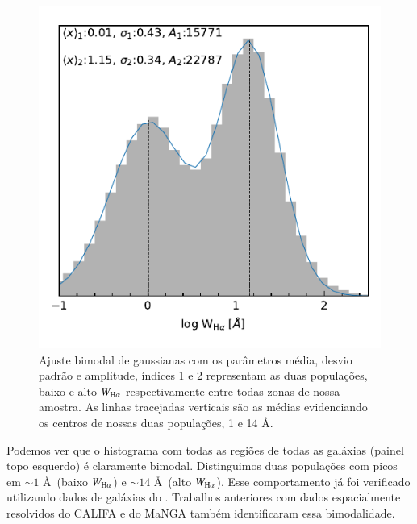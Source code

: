 \begin{figure}
\includegraphics[scale=0.9]{figuras/bimodalWHa_model.pdf}
\caption[Ajuste gaussiano de $W_{\Ha}$]
{Ajuste bimodal de gaussianas com os parâmetros média, desvio padrão e amplitude, índices 1 e 2 representam as duas populações, baixo e alto $W_{\Ha}$ respectivamente entre todas zonas de nossa amostra. As linhas tracejadas verticais são as médias evidenciando os centros de nossas duas populações, 1 e 14 \AA.}
 \label{fig:bimodal_model}
\end{figure}

Podemos ver que o histograma com todas as regiões de todas as galáxias (painel topo esquerdo) é claramente bimodal. Distinguimos duas populações com picos em $\sim 1$ \AA\ (baixo $W_{\Ha}$) e $\sim 14$ \AA\ (alto $W_{\Ha}$). Esse comportamento já foi verificado utilizando dados de galáxias do \SDSS \citep{Bamford.etal.2008a, CidFernandes.etal.2011a}. Trabalhos anteriores com dados espacialmente resolvidos do CALIFA \citep{Morisset.etal.2016} e do MaNGA \citep{Belfiore.etal.2016, Belfiore.etal.2017} também identificaram essa bimodalidade.

